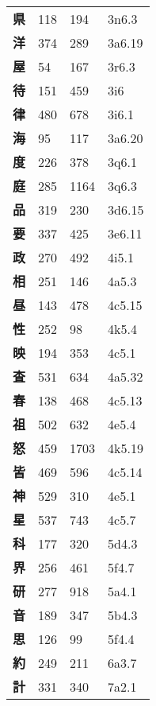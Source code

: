 \begin{longtable}[c]{llll}
    \bfseries 県 & 118 & 194 & 3n6.3\\
    \bfseries 洋 & 374 & 289 & 3a6.19\\
    \bfseries 屋 & 54 & 167 & 3r6.3\\
    \bfseries 待 & 151 & 459 & 3i6\\
    \bfseries 律 & 480 & 678 & 3i6.1\\
    \bfseries 海 & 95 & 117 & 3a6.20\\
    \bfseries 度 & 226 & 378 & 3q6.1\\
    \bfseries 庭 & 285 & 1164 & 3q6.3\\
    \bfseries 品 & 319 & 230 & 3d6.15\\
    \bfseries 要 & 337 & 425 & 3e6.11\\
    \bfseries 政 & 270 & 492 & 4i5.1\\
    \bfseries 相 & 251 & 146 & 4a5.3\\
    \bfseries 昼 & 143 & 478 & 4c5.15\\
    \bfseries 性 & 252 & 98 & 4k5.4\\
    \bfseries 映 & 194 & 353 & 4c5.1\\
    \bfseries 査 & 531 & 634 & 4a5.32\\
    \bfseries 春 & 138 & 468 & 4c5.13\\
    \bfseries 祖 & 502 & 632 & 4e5.4\\
    \bfseries 怒 & 459 & 1703 & 4k5.19\\
    \bfseries 皆 & 469 & 596 & 4c5.14\\
    \bfseries 神 & 529 & 310 & 4e5.1\\
    \bfseries 星 & 537 & 743 & 4c5.7\\
    \bfseries 科 & 177 & 320 & 5d4.3\\
    \bfseries 界 & 256 & 461 & 5f4.7\\
    \bfseries 研 & 277 & 918 & 5a4.1\\
    \bfseries 音 & 189 & 347 & 5b4.3\\
    \bfseries 思 & 126 & 99 & 5f4.4\\
    \bfseries 約 & 249 & 211 & 6a3.7\\
    \bfseries 計 & 331 & 340 & 7a2.1\\
  \end{longtable}
